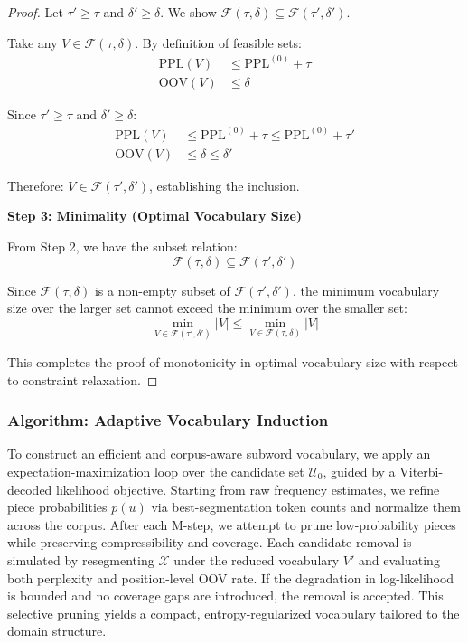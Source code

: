 \begin{proof}
	Let \(\tau' \ge \tau\) and \(\delta' \ge \delta\). We show \(\mathcal F(\tau,\delta) \subseteq \mathcal F(\tau',\delta')\).
	
	Take any \(V \in \mathcal F(\tau,\delta)\). By definition of feasible sets:
	\begin{align}
	\mathrm{PPL}(V) &\le \mathrm{PPL}^{(0)} + \tau \\
	\mathrm{OOV}(V) &\le \delta
	\end{align}
	
	Since \(\tau' \ge \tau\) and \(\delta' \ge \delta\):
	\begin{align}
	\mathrm{PPL}(V) &\le \mathrm{PPL}^{(0)} + \tau \le \mathrm{PPL}^{(0)} + \tau' \\
	\mathrm{OOV}(V) &\le \delta \le \delta'
	\end{align}
	
	Therefore: \(V \in \mathcal F(\tau',\delta')\), establishing the inclusion.
	
	\textbf{Step 3: Minimality (Optimal Vocabulary Size)}
	
	From Step 2, we have the subset relation:
	\[
	\mathcal F(\tau,\delta) \subseteq \mathcal F(\tau',\delta')
	\]
	
	Since \(\mathcal F(\tau,\delta)\) is a non-empty subset of \(\mathcal F(\tau',\delta')\), the minimum vocabulary size over the larger set cannot exceed the minimum over the smaller set:
	\[
	\min_{V \in \mathcal F(\tau',\delta')} |V| \le \min_{V \in \mathcal F(\tau,\delta)} |V|
	\]
	
	This completes the proof of monotonicity in optimal vocabulary size with respect to constraint relaxation.
\end{proof}

\subsubsection{Algorithm: Adaptive Vocabulary Induction}

To construct an efficient and corpus-aware subword vocabulary, we apply an expectation-maximization loop over the candidate set \(\mathcal{U}_0\), guided by a Viterbi-decoded likelihood objective. Starting from raw frequency estimates, we refine piece probabilities \(p(u)\) via best-segmentation token counts and normalize them across the corpus. After each M-step, we attempt to prune low-probability pieces while preserving compressibility and coverage. Each candidate removal is simulated by resegmenting \(\mathcal{X}\) under the reduced vocabulary \(V'\) and evaluating both perplexity and position-level OOV rate. If the degradation in log-likelihood is bounded and no coverage gaps are introduced, the removal is accepted. This selective pruning yields a compact, entropy-regularized vocabulary tailored to the domain structure.

